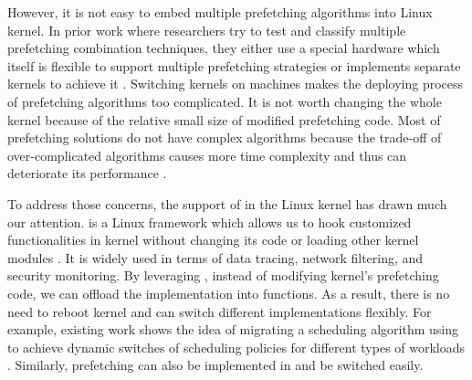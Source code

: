 However, it is not easy to embed multiple prefetching algorithms into Linux kernel.
In prior work where researchers try to test and classify multiple prefetching combination techniques, they either use a special hardware which itself is flexible to support multiple prefetching strategies \cite{cross-prefetch-schedule} or implements separate kernels to achieve it \cite{Classify_prefetch}. Switching kernels on machines makes the deploying process of prefetching algorithms too complicated.
It is not worth changing the whole kernel because of the relative small size of modified prefetching code.
Most of prefetching solutions do not have complex algorithms because the trade-off of over-complicated algorithms causes more time complexity and thus can deteriorate its performance \cite{Classify_prefetch}.

To address those concerns, the support of \ebpf in the Linux kernel has drawn much our attention. 
\ebpf is a Linux framework which allows us to hook customized functionalities in kernel without changing its code or loading other kernel modules \cite{ebpf}. It is widely used in terms of data tracing, network filtering, and security monitoring. By leveraging \ebpf, instead of modifying kernel's prefetching code, we can offload the implementation into \ebpf functions. 
As a result, there is no need to reboot kernel and can switch different implementations flexibly. For example, existing work shows the idea of migrating a scheduling algorithm using \ebpf to achieve dynamic switches of scheduling policies for different types of workloads \cite{ghOSt_ebpf}. Similarly, prefetching can also be implemented in \ebpf and be switched easily.

